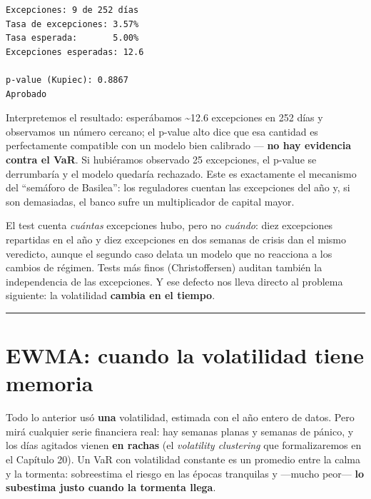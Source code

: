 \documentclass[
  spanish,
  letterpaper,
  DIV=11,
  numbers=noendperiod]{scrreprt}
\begin{document}
\begin{verbatim}
Excepciones: 9 de 252 días
Tasa de excepciones: 3.57%
Tasa esperada:       5.00%
Excepciones esperadas: 12.6

p-value (Kupiec): 0.8867
Aprobado
\end{verbatim}

Interpretemos el resultado: esperábamos \textasciitilde12.6 excepciones
en 252 días y observamos un número cercano; el p-value alto dice que esa
cantidad es perfectamente compatible con un modelo bien calibrado ---
\textbf{no hay evidencia contra el VaR}. Si hubiéramos observado 25
excepciones, el p-value se derrumbaría y el modelo quedaría rechazado.
Este es exactamente el mecanismo del ``semáforo de Basilea'': los
reguladores cuentan las excepciones del año y, si son demasiadas, el
banco sufre un multiplicador de capital mayor.

\begin{tcolorbox}[enhanced jigsaw, bottomrule=.15mm, colback=white, opacitybacktitle=0.6, arc=.35mm, toprule=.15mm, opacityback=0, breakable, titlerule=0mm, left=2mm, coltitle=black, colbacktitle=quarto-callout-note-color!10!white, colframe=quarto-callout-note-color-frame, leftrule=.75mm, toptitle=1mm, bottomtitle=1mm, title=\textcolor{quarto-callout-note-color}{\faInfo}\hspace{0.5em}{Lo que Kupiec no ve}, rightrule=.15mm]

El test cuenta \emph{cuántas} excepciones hubo, pero no \emph{cuándo}:
diez excepciones repartidas en el año y diez excepciones en dos semanas
de crisis dan el mismo veredicto, aunque el segundo caso delata un
modelo que no reacciona a los cambios de régimen. Tests más finos
(Christoffersen) auditan también la independencia de las excepciones. Y
ese defecto nos lleva directo al problema siguiente: la volatilidad
\textbf{cambia en el tiempo}.

\end{tcolorbox}

\begin{center}\rule{0.5\linewidth}{0.5pt}\end{center}

\chapter{EWMA: cuando la volatilidad tiene
memoria}\label{ewma-cuando-la-volatilidad-tiene-memoria}

Todo lo anterior usó \textbf{una} volatilidad, estimada con el año
entero de datos. Pero mirá cualquier serie financiera real: hay semanas
planas y semanas de pánico, y los días agitados vienen \textbf{en
rachas} (el \emph{volatility clustering} que formalizaremos en el
Capítulo 20). Un VaR con volatilidad constante es un promedio entre la
calma y la tormenta: sobreestima el riesgo en las épocas tranquilas y
---mucho peor--- \textbf{lo subestima justo cuando la tormenta llega}.
\end{document}
